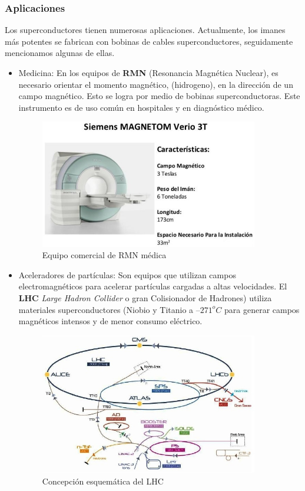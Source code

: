 \subsubsection{Aplicaciones}

Los superconductores tienen numerosas aplicaciones. Actualmente, los imanes más potentes se fabrican con bobinas de cables superconductores, seguidamente mencionamos algunas de ellas.

\begin{itemize}
	\item Medicina: En los equipos de \textbf{RMN} (Resonancia Magnética Nuclear), es necesario orientar el momento magnético, (hidrogeno), en la dirección de un campo magnético. Esto se logra por medio de bobinas superconductoras. Este instrumento es de uso común en hospitales y en diagnóstico médico.
	
\begin{figure}[H]
    \centering
    \includegraphics[width=0.9\textwidth]{./Figures/fig443}
	\caption{Equipo comercial de RMN médica}
	\label{fig:443}
\end{figure}
	
	
	\item Aceleradores de partículas: Son equipos que utilizan campos electromagnéticos para acelerar partículas cargadas a altas velocidades. El \textbf{LHC}  \textit{Large Hadron Collider} o gran Colisionador de Hadrones) utiliza materiales superconductores (Niobio y
Titanio a $–271^{o}C$ para generar campos magnéticos intensos y de menor consumo eléctrico.

\begin{figure}[H]
    \centering
    \includegraphics[width=0.9\textwidth]{./Figures/fig444}
	\caption{Concepción esquemática del LHC}
	\label{fig:444}
\end{figure}


\end{itemize}
